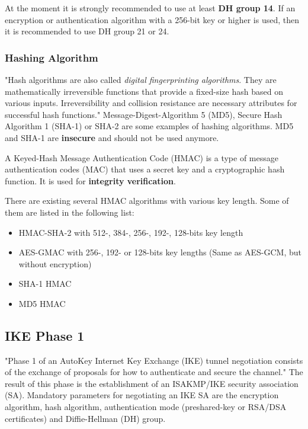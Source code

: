 \documentclass[a4paper]{report}
\begin{document}
At the moment it is strongly recommended to use at least \textbf{DH group 14}. If an encryption or authentication algorithm with a 256-bit key or higher is used, then it is recommended to use DH group 21 or 24. \parencite{StrongSwan}

\subsubsection{Hashing Algorithm}
\label{sssec:hashing_algo}
"Hash algorithms are also called \textit{digital fingerprinting algorithms}. They are mathematically irreversible functions that provide a fixed-size hash based on various inputs. Irreversibility and collision resistance are necessary attributes for successful hash functions." \parencite{Kampanakis2015}
Message-Digest-Algorithm 5 (MD5), Secure Hash Algorithm 1 (SHA-1) or SHA-2 are some examples of hashing algorithms. MD5 and SHA-1 are \textbf{insecure} and should not be used anymore. 

A Keyed-Hash Message Authentication Code (HMAC) is a type of message authentication codes (MAC) that uses a secret key and a cryptographic hash function. It is used for 
\textbf{integrity verification}.

There are existing several HMAC algorithms with various key length. Some of them are listed in the following list:
\begin{itemize}
	\item HMAC-SHA-2 with 512-, 384-, 256-, 192-, 128-bits key length
	\item AES-GMAC with 256-, 192- or 128-bits key lengths (Same as AES-GCM, but without encryption)
	\item SHA-1 HMAC
	\item MD5 HMAC
\end{itemize}

\subsection{IKE Phase 1}
\label{ssec:Phase1}
"Phase 1 of an AutoKey Internet Key Exchange (IKE) tunnel negotiation consists of the exchange of proposals for how to authenticate and secure the channel." \parencite{JuniperNetworks2016} The result of this phase is the establishment of an ISAKMP/IKE security association (SA). Mandatory parameters for negotiating an IKE SA are the encryption algorithm, hash algorithm, authentication mode (preshared-key or RSA/DSA certificates) and Diffie-Hellman (DH) group.
\end{document}
